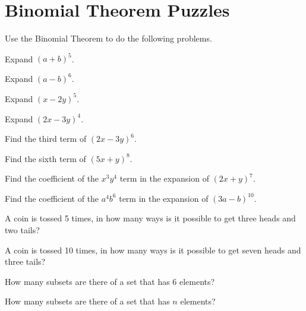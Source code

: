 \section{Binomial Theorem Puzzles}

Use the Binomial Theorem to do the following problems.

\begin{puzzle}
    Expand \( (a + b)^5 \).
\end{puzzle}

\begin{puzzle}
    Expand \( (a - b)^6 \).
\end{puzzle}

\begin{puzzle}
    Expand \( (x - 2y)^5 \).
\end{puzzle}

\begin{puzzle}
    Expand \( (2x - 3y)^4 \).
\end{puzzle}

\begin{puzzle}
    Find the third term of \( (2x - 3y)^6 \).
\end{puzzle}

\begin{puzzle}
    Find the sixth term of \( (5x + y)^8 \).
\end{puzzle}

\begin{puzzle}
    Find the coefficient of the \( x^3y^4 \) term in the expansion of \( (2x + y)^7 \).
\end{puzzle}

\begin{puzzle}
    Find the coefficient of the \( a^4b^6 \) term in the expansion of \( (3a - b)^{10} \).
\end{puzzle}

\begin{puzzle}
    A coin is tossed 5 times, in how many ways is it possible to get three heads and two tails?
\end{puzzle}

\begin{puzzle}
    A coin is tossed 10 times, in how many ways is it possible to get seven heads and three tails?
\end{puzzle}

\begin{puzzle}
    How many subsets are there of a set that has 6 elements?
\end{puzzle}

\begin{puzzle}
    How many subsets are there of a set that has \( n \) elements?
\end{puzzle}